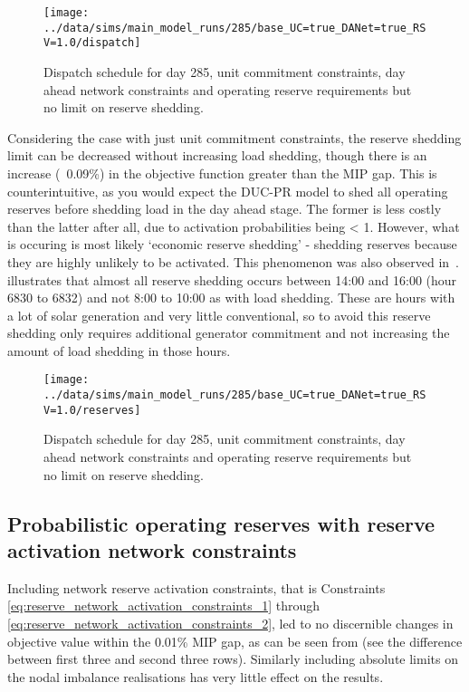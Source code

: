 \documentclass[number,times]{elsarticle}
\begin{document}
\begin{figure}[H]
    \centering
    \texttt{[image: ../data/sims/main\_model\_runs/285/base\_UC=true\_DANet=true\_RSV=1.0/dispatch]}
    \caption{Dispatch schedule for day 285, unit commitment constraints, day ahead network constraints and operating reserve requirements but no limit on reserve shedding.\label{fig:dispatch_with_operating_reserves}}
\end{figure}

Considering the case with just unit commitment constraints, the reserve shedding limit can be decreased without increasing load shedding, though there is an increase (~0.09\%) in the objective function greater than the MIP gap. This is counterintuitive, as you would expect the DUC-PR model to shed all operating reserves before shedding load in the day ahead stage. The former is less costly than the latter after all, due to activation probabilities being < 1. However, what is occuring is most likely `economic reserve shedding' - shedding reserves because they are highly unlikely to be activated. This phenomenon was also observed in~\cite{Hermans2018}.  illustrates that almost all reserve shedding occurs between 14:00 and 16:00 (hour 6830 to 6832) and not 8:00 to 10:00 as with load shedding. These are hours with a lot of solar generation and very little conventional, so to avoid this reserve shedding only requires additional generator commitment and not increasing the amount of load shedding in those hours.

\begin{figure}[H]
    \centering
    \texttt{[image: ../data/sims/main\_model\_runs/285/base\_UC=true\_DANet=true\_RSV=1.0/reserves]}
    \caption{Dispatch schedule for day 285, unit commitment constraints, day ahead network constraints and operating reserve requirements but no limit on reserve shedding.\label{fig:reserves_with_operating_reserves}}
\end{figure}

\subsection{Probabilistic operating reserves with reserve activation network constraints}

Including network reserve activation constraints, that is Constraints \ref{eq:reserve_network_activation_constraints_1} through \ref{eq:reserve_network_activation_constraints_2}, led to no discernible changes in objective value within the 0.01\% MIP gap, as can be seen from  (see the difference between first three and second three rows). Similarly including absolute limits on the nodal imbalance realisations has very little effect on the results.
\end{document}
